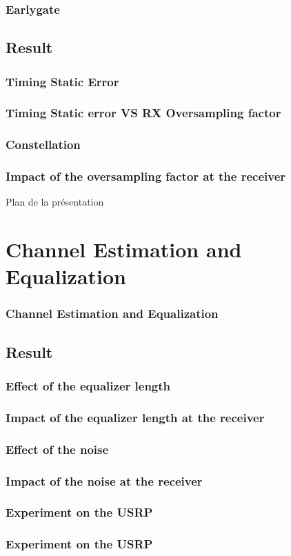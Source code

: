 \documentclass[11pt]{beamer}
\begin{document}
\begin{frame}
\frametitle{Earlygate}


\end{frame}

\subsection{Result}
\subsubsection{Timing Static Error}
\begin{frame}
\frametitle{Timing Static error VS RX Oversampling factor}

\end{frame}

\subsubsection{Constellation}

\begin{frame}
\frametitle{Impact of the oversampling factor at the receiver}


\end{frame}

{
	\begin{frame}[noframenumbering]{Plan de la présentation}
		\tableofcontents
	\end{frame}
}

\section{Channel Estimation and Equalization}
\begin{frame}
\frametitle{Channel Estimation and Equalization}

\end{frame}

\begin{frame}


\end{frame}
\subsection{Result}
\subsubsection{Effect of the equalizer length}
\begin{frame}
\frametitle{Impact of the equalizer length at the receiver}


\end{frame}
\subsubsection{Effect of the noise}
\begin{frame}
\frametitle{Impact of the noise at the receiver}

\end{frame}
\subsubsection{Experiment on the USRP}
\begin{frame}
\frametitle{Experiment on the USRP}

\end{frame}
\end{document}
